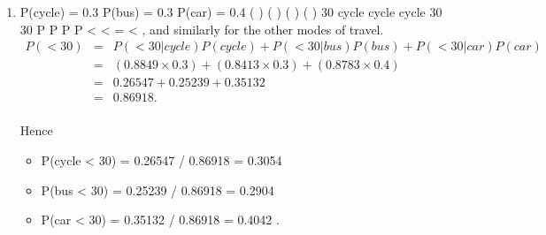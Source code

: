 \documentclass[a4paper,12pt]{article}
\begin{document}
\begin{enumerate}
\begin{framed}
\end{framed}
\item  P(cycle) = 0.3 P(bus) = 0.3 P(car) = 0.4
( ) ( ) ( )
( )
30 cycle cycle
cycle 30
30
P P
P
P
<
< =
<
, and similarly for the other modes of travel.
\begin{eqnarray*}
P(< 30) &=& P(< 30| cycle)P(cycle) + P(< 30| bus)P(bus) + P(< 30| car)P(car)\\
&=& (0.8849\times 0.3) + (0.8413\times 0.3) + (0.8783\times 0.4)\\
&=& 0.26547 + 0.25239 + 0.35132 \\ 
&=& 0.86918.\\
\end{eqnarray*}

Hence 
\begin{itemize}
\item P(cycle < 30) = 0.26547 / 0.86918 = 0.3054
\item P(bus < 30) = 0.25239 / 0.86918 = 0.2904
\item P(car < 30) = 0.35132 / 0.86918 = 0.4042 .
\end{itemize}
\end{enumerate}
\end{document}
